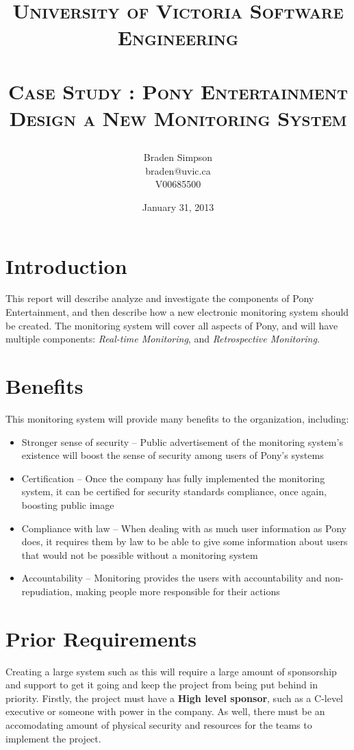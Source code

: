 \documentclass{article}
\title{
\large{\textsc{University of Victoria Software Engineering}}\huge\\ [0pt] %
\horrule{0.5pt}\\[0.4cm]
\textsc{Case Study : Pony Entertainment\\Design a New Monitoring System}\\
\author{Braden Simpson\\braden@uvic.ca\\V00685500}
\date{January 31, 2013}
}
\numberwithin{equation}{section} %
\numberwithin{figure}{section} %
\numberwithin{table}{section} %
\begin{document}
\maketitle %


\section{Introduction}
\label{sec:intro}
This report will describe analyze and investigate the components of Pony Entertainment, and then describe how a new electronic monitoring system should be created.  The monitoring system will cover all aspects of Pony, and will have multiple components: \textit{Real-time Monitoring}, and \textit{Retrospective Monitoring}.  

\section{Benefits}
This monitoring system will provide many benefits to the organization, including:
\begin{itemize}
	\item Stronger sense of security -- Public advertisement of the monitoring system's existence will boost the sense of security among users of Pony's systems
	\item Certification -- Once the company has fully implemented the monitoring system, it can be certified for security standards compliance, once again, boosting public image
	\item Compliance with law -- When dealing with as much user information as Pony does, it requires them by law to be able to give some information about users that would not be possible without a monitoring system
	\item Accountability -- Monitoring provides the users with accountability and non-repudiation, making people more responsible for their actions
\end{itemize}

\section{Prior Requirements}
Creating a large system such as this will require a large amount of sponsorship and support to get it going and keep the project from being put behind in priority.  Firstly, the project must have a \textbf{High level sponsor}, such as a C-level executive or someone with power in the company.  As well, there must be an accomodating amount of physical security and resources for the teams to implement the project.\\
\end{document}
